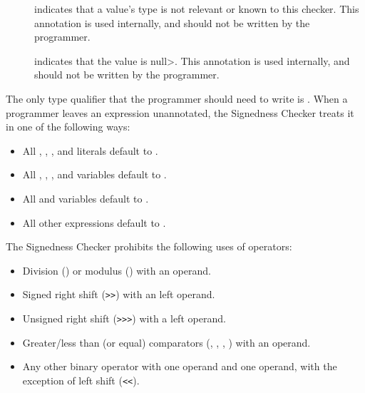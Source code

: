 \begin{description}
\item[]
    indicates that a value's type is not relevant or known to this checker.
    This annotation is used internally, and should not be
    written by the programmer.

\item[]
  indicates that the value is \<null>.
    This annotation is used internally, and should not
    be written by the programmer.

\end{description}



The only type qualifier that the programmer should need to write is
.
When a programmer leaves an expression unannotated, the
Signedness Checker treats it in one of the following ways:

\begin{itemize}

    \item
    All , , , and  literals default
    to .
    \item
    All , , , and  variables default
    to .
    \item
    All  and  variables default to
    .
    \item
    All other expressions default to .

\end{itemize}


The Signedness Checker prohibits the following uses of operators:

\begin{itemize}

    \item
    Division (\code{/}) or modulus (\code{\%}) with an 
    operand.
    \item
    Signed right shift (\verb|>>|) with an  left operand.
    \item
    Unsigned right shift (\verb|>>>|) with a  left operand.
    \item
    Greater/less than (or equal) comparators
    (\code{<}, \code{<=}, \code{>}, \code{>=}) with an 
    operand.
    \item
    Any other binary operator with one  operand and one
     operand, with the exception of left shift (\verb|<<|).

\end{itemize}

